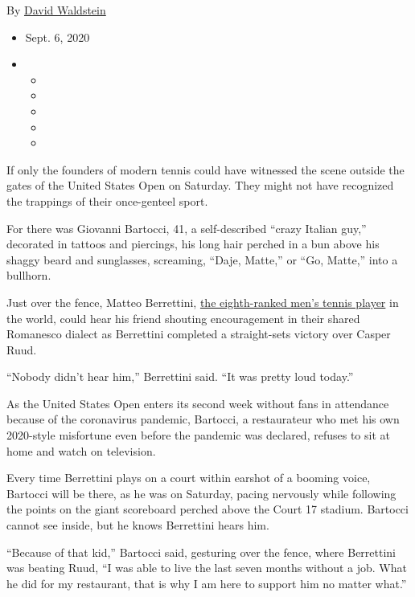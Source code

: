 By \href{https://www.nytimes3xbfgragh.onion/by/david-waldstein}{David
Waldstein}

\begin{itemize}
\item
  Sept. 6, 2020
\item
  \begin{itemize}
  \item
  \item
  \item
  \item
  \item
  \end{itemize}
\end{itemize}

If only the founders of modern tennis could have witnessed the scene
outside the gates of the United States Open on Saturday. They might not
have recognized the trappings of their once-genteel sport.

For there was Giovanni Bartocci, 41, a self-described ``crazy Italian
guy,'' decorated in tattoos and piercings, his long hair perched in a
bun above his shaggy beard and sunglasses, screaming, ``Daje, Matte,''
or ``Go, Matte,'' into a bullhorn.

Just over the fence, Matteo Berrettini,
\href{https://www.atptour.com/en/rankings/singles}{the eighth-ranked
men's tennis player} in the world, could hear his friend shouting
encouragement in their shared Romanesco dialect as Berrettini completed
a straight-sets victory over Casper Ruud.

``Nobody didn't hear him,'' Berrettini said. ``It was pretty loud
today.''

As the United States Open enters its second week without fans in
attendance because of the coronavirus pandemic, Bartocci, a restaurateur
who met his own 2020-style misfortune even before the pandemic was
declared, refuses to sit at home and watch on television.

Every time Berrettini plays on a court within earshot of a booming
voice, Bartocci will be there, as he was on Saturday, pacing nervously
while following the points on the giant scoreboard perched above the
Court 17 stadium. Bartocci cannot see inside, but he knows Berrettini
hears him.

``Because of that kid,'' Bartocci said, gesturing over the fence, where
Berrettini was beating Ruud, ``I was able to live the last seven months
without a job. What he did for my restaurant, that is why I am here to
support him no matter what.''

